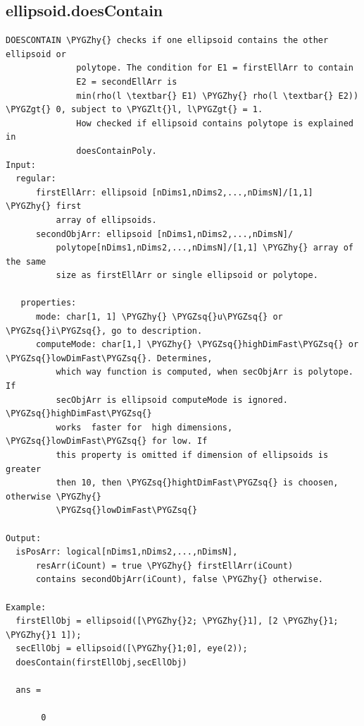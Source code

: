 \documentclass[letterpaper,10pt,english]{sphinxmanual}
\def\PYGZlt{\char`\<}
\def\PYGZgt{\char`\>}
\def\PYGZhy{\char`\-}
\def\PYGZsq{\char`\'}
\begin{document}
\subsection{ellipsoid.doesContain}
\label{chap_functions:ellipsoid-doescontain}
\begin{Verbatim}[commandchars=\\\{\}]
DOESCONTAIN \PYGZhy{} checks if one ellipsoid contains the other ellipsoid or
              polytope. The condition for E1 = firstEllArr to contain
              E2 = secondEllArr is
              min(rho(l \textbar{} E1) \PYGZhy{} rho(l \textbar{} E2)) \PYGZgt{} 0, subject to \PYGZlt{}l, l\PYGZgt{} = 1.
              How checked if ellipsoid contains polytope is explained in
              doesContainPoly.
Input:
  regular:
      firstEllArr: ellipsoid [nDims1,nDims2,...,nDimsN]/[1,1] \PYGZhy{} first
          array of ellipsoids.
      secondObjArr: ellipsoid [nDims1,nDims2,...,nDimsN]/
          polytope[nDims1,nDims2,...,nDimsN]/[1,1] \PYGZhy{} array of the same
          size as firstEllArr or single ellipsoid or polytope.

   properties:
      mode: char[1, 1] \PYGZhy{} \PYGZsq{}u\PYGZsq{} or \PYGZsq{}i\PYGZsq{}, go to description.
      computeMode: char[1,] \PYGZhy{} \PYGZsq{}highDimFast\PYGZsq{} or \PYGZsq{}lowDimFast\PYGZsq{}. Determines,
          which way function is computed, when secObjArr is polytope. If
          secObjArr is ellipsoid computeMode is ignored. \PYGZsq{}highDimFast\PYGZsq{}
          works  faster for  high dimensions, \PYGZsq{}lowDimFast\PYGZsq{} for low. If
          this property is omitted if dimension of ellipsoids is greater
          then 10, then \PYGZsq{}hightDimFast\PYGZsq{} is choosen, otherwise \PYGZhy{}
          \PYGZsq{}lowDimFast\PYGZsq{}

Output:
  isPosArr: logical[nDims1,nDims2,...,nDimsN],
      resArr(iCount) = true \PYGZhy{} firstEllArr(iCount)
      contains secondObjArr(iCount), false \PYGZhy{} otherwise.

Example:
  firstEllObj = ellipsoid([\PYGZhy{}2; \PYGZhy{}1], [2 \PYGZhy{}1; \PYGZhy{}1 1]);
  secEllObj = ellipsoid([\PYGZhy{}1;0], eye(2));
  doesContain(firstEllObj,secEllObj)

  ans =

       0
\end{Verbatim}
\end{document}
